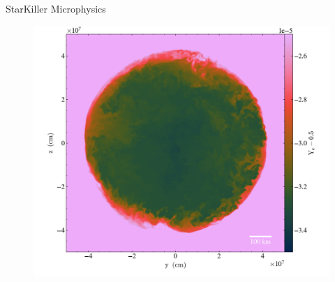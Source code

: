 \documentclass[final]{beamer}
\newlength{\onecolwid}
\newlength{\twocolwid}
\newcommand{\isot}[2]{$^{#2}\mathrm{#1}$}
\begin{document}
\begin{frame}[t]
\begin{columns}[t]
\begin{column}{\twocolwid}
\begin{columns}[t,totalwidth=\twocolwid]
\begin{column}{\onecolwid}
\begin{block}{StarKiller Microphysics}
\begin{figure}
\includegraphics[width=\linewidth]{figures/starkiller-network/wd_4lev_Tc5-5e8_rhoc4-5e9_plt06605_slice_x_electron_fraction_asymmetry.png}
\end{figure}

\end{block}


\end{column} %

\end{columns} %






\end{column}
\end{columns}
\end{frame}
\end{document}
